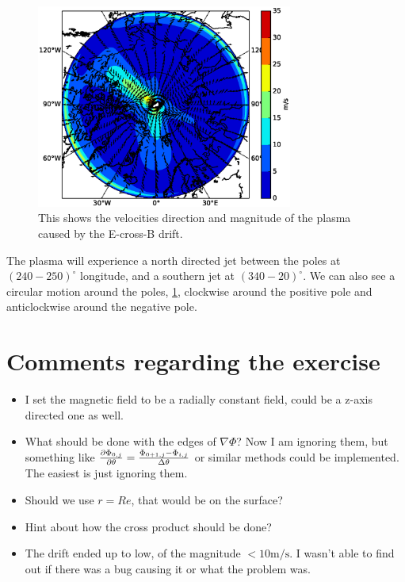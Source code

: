 \documentclass[x11names]{article}
\begin{document}
    \begin{figure}
      \centering
      \includegraphics[width = 0.75\textwidth]{../source/map_drift}
      \caption{This shows the velocities direction and magnitude of the plasma caused by the E-cross-B drift. }
      \label{fig:velocity}
    \end{figure}

    The plasma will experience a north directed jet between the poles at \((240-250) ^\circ\) longitude, and a southern jet at \((340- 20) ^\circ\). We can also see a circular motion around the poles, \cref{fig:velocity}, clockwise around the positive pole and anticlockwise around the negative pole.




\appendix
\section{Comments regarding the exercise}
    \begin{itemize}
      \item I set the magnetic field to be a radially constant field, could be a z-axis directed one as well.
      \item What should be done with the edges of \(\nabla \Phi\)? Now I am ignoring them, but something like \( \pdv{\Phi_{0,j}}{\theta} = \frac{ \Phi_{0+1, j} - \Phi_{i, j} }{\Delta \theta}\) or similar methods could be implemented. The easiest is just ignoring them.
      \item Should we use \(r = Re\), that would be on the surface?
      \item Hint about how the cross product should be done?
      \item The drift ended up to low, of the magnitude \(<10 \si{\meter\per\second}\). I wasn't able to find out if there was a bug causing it or what the problem was.
    \end{itemize}
\end{document}
